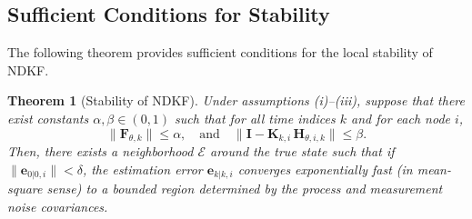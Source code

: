 \documentclass[letterpaper, 10 pt, conference]{ieeeconf}
\newtheorem{theorem}{Theorem}
\begin{document}
\subsection{Sufficient Conditions for Stability}
The following theorem provides sufficient conditions for the local stability of NDKF.

\begin{theorem}[Stability of NDKF]
\label{thm:local-stability}
Under assumptions (i)--(iii), suppose that there exist constants $\alpha,\beta \in (0,1)$ such that for all time indices $k$ and for each node $i$,
\begin{equation}
    \| \mathbf{F}_{\theta,k} \| \leq \alpha,
    \quad \text{and} \quad 
    \| \mathbf{I} - \mathbf{K}_{k,i}\,\mathbf{H}_{\theta,i,k} \| \leq \beta. \label{eq:cond-beta}
\end{equation}
Then, there exists a neighborhood $\mathcal{E}$ around the true state such that if $\| \mathbf{e}_{0|0,i} \| < \delta$, the estimation error $\mathbf{e}_{k|k,i}$ converges exponentially fast (in mean-square sense) to a bounded region determined by the process and measurement noise covariances.
\end{theorem}
\end{document}
